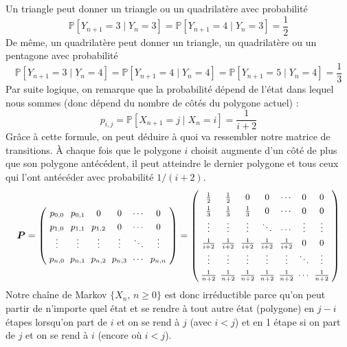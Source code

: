 \documentclass{article}
\begin{document}
\noindent Un triangle peut donner un triangle ou un quadrilatère avec probabilité
\[
    \mathbb{P}[Y_{n+1}=3\mid Y_n=3]=\mathbb{P}[Y_{n+1}=4\mid Y_n=3]=\frac{1}{2}
\]
De même, un quadrilatère peut donner un triangle, un quadrilatère ou un pentagone avec 
probabilité
\[
    \mathbb{P}[Y_{n+1}=3\mid Y_n=4]=\mathbb{P}[Y_{n+1}=4\mid Y_n=4]=\mathbb{P}[Y_{n+1}=5\mid Y_n=4]=\frac{1}{3}
\]
Par suite logique, on remarque que la probabilité dépend de l'état dans lequel nous 
sommes (donc dépend du nombre de côtés du polygone actuel) :
\[
    p_{i,j}=\mathbb{P}[X_{n+1}=j\mid X_n=i]=\frac{1}{i+2}
\]
Grâce à cette formule, on peut déduire à quoi va ressembler notre matrice de transitions.
À chaque fois que le polygone $i$ choisit augmente d'un côté de plus que son polygone
antécédent, il peut atteindre le dernier polygone et tous ceux qui l'ont antécéder avec
probabilité $1/(i+2)$.
\[
    \boldsymbol{P}=\left(
        \begingroup
        \renewcommand{\arraystretch}{1.3}
        \setlength{\arraycolsep}{3pt}
        \small
        \begin{array}{*{6}{c}}
        p_{0,0} & p_{0,1} & 0 & 0 & \cdots & 0 \\
        p_{1,0} & p_{1,1} & p_{1,2} & 0 & \cdots & 0 \\
        \vdots & \vdots & \vdots & \vdots & \ddots & \vdots \\
        p_{n,0} & p_{n,1} & p_{n,2} & p_{n,3} &  \cdots & p_{n,n}
    \end{array}
    \endgroup
    \right)
    =
    \left(
        \begingroup
        \renewcommand{\arraystretch}{1.3}
        \setlength{\arraycolsep}{2pt}
        \small
        \begin{array}{*{7}{c}}
        \frac{1}{2} & \frac{1}{2} & 0 & 0 & \cdots & 0 & 0 \\
        \frac{1}{3} & \frac{1}{3} & \frac{1}{3} & 0 & \cdots & 0 & 0 \\
        \vdots & \vdots & \vdots & \ddots & \cdots & \vdots & \vdots \\
        \frac{1}{i+2} & \frac{1}{i+2} & \frac{1}{i+2} & \frac{1}{i+2} & \frac{1}{i+2} & 0 & 0 \\
        \vdots & \vdots & \vdots & \vdots & \vdots & \ddots & \vdots \\
        \frac{1}{n+2} & \frac{1}{n+2} & \frac{1}{n+2} & \frac{1}{n+2} & \frac{1}{n+2} & \cdots & \frac{1}{n+2}
    \end{array}
    \endgroup
    \right)
\]
Notre chaîne de Markov $\{X_n,\,n\ge 0\}$ est donc irréductible parce qu'on peut partir de
n'importe quel état et se rendre à tout autre état (polygone) en $j-i$ étapes lorsqu'on part
de $i$ et on se rend à $j$ (avec $i<j$) et en 1 étape si on part de $j$ et on se rend à $i$ 
(encore où $i<j$).
\end{document}
